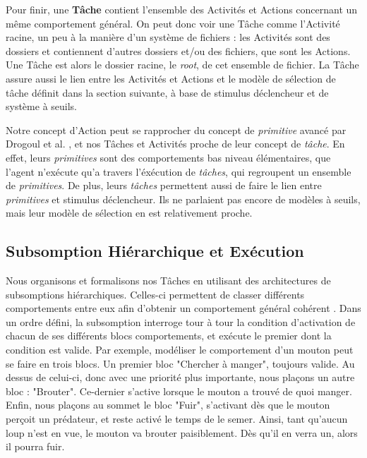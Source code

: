 			Pour finir, une \textbf{Tâche} contient l'ensemble des Activités et Actions concernant un même comportement général. On peut donc voir une Tâche comme l'Activité racine, un peu à la manière d'un système de fichiers : les Activités sont des dossiers et contiennent d'autres dossiers et/ou des fichiers, que sont les Actions. Une Tâche est alors le dossier racine, le \textit{root}, de cet ensemble de fichier. La Tâche assure aussi le lien entre les Activités et Actions et le modèle de sélection de tâche définit dans la section suivante, à base de stimulus déclencheur et de système à seuils.
			
			Notre concept d'Action peut se rapprocher du concept de \textit{primitive} avancé par Drogoul et al. \cite{drogoul_multi-agent_1992}, et nos Tâches et Activités proche de leur concept de \textit{tâche}. En effet, leurs \textit{primitives} sont des comportements bas niveau élémentaires, que l'agent n'exécute qu'a travers l'éxécution de \textit{tâches}, qui regroupent un ensemble de \textit{primitives}. De plus, leurs \textit{tâches} permettent aussi de faire le lien entre \textit{primitives} et stimulus déclencheur. Ils ne parlaient pas encore de modèles à seuils, mais leur modèle de sélection en est relativement proche.
			
		\subsection{Subsomption Hiérarchique et Exécution}
		
			Nous organisons et formalisons nos Tâches en utilisant des architectures de subsomptions hiérarchiques. Celles-ci permettent de classer différents comportements entre eux afin d'obtenir un comportement général cohérent \cite{brooks_robust_1986}. Dans un ordre défini, la subsomption interroge tour à tour la condition d'activation de chacun de ses différents blocs comportements, et exécute le premier dont la condition est valide. Par exemple, modéliser le comportement d'un mouton peut se faire en trois blocs. Un premier bloc "Chercher à manger", toujours valide. Au dessus de celui-ci, donc avec une priorité plus importante, nous plaçons un autre bloc : "Brouter". Ce-dernier s'active lorsque le mouton a trouvé de quoi manger. Enfin, nous plaçons au sommet le bloc "Fuir", s'activant dès que le mouton perçoit un prédateur, et reste activé le temps de le semer. Ainsi, tant qu'aucun loup n'est en vue, le mouton va brouter paisiblement. Dès qu'il en verra un, alors il pourra fuir.
			

